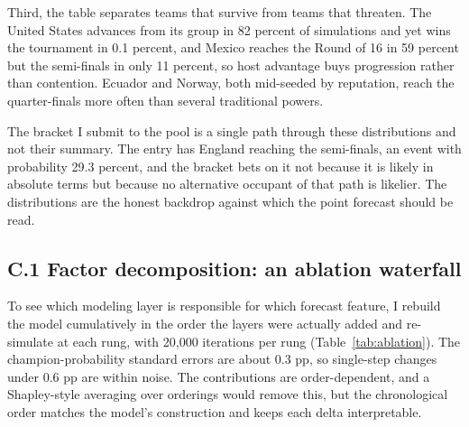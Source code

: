 \documentclass[11pt,letterpaper]{article}
\begin{document}
Third, the table separates teams that survive from teams that threaten. The United States advances from its group in 82 percent of simulations and yet wins the tournament in 0.1 percent, and Mexico reaches the Round of 16 in 59 percent but the semi-finals in only 11 percent, so host advantage buys progression rather than contention. Ecuador and Norway, both mid-seeded by reputation, reach the quarter-finals more often than several traditional powers.

The bracket I submit to the pool is a single path through these distributions and not their summary. The entry has England reaching the semi-finals, an event with probability 29.3 percent, and the bracket bets on it not because it is likely in absolute terms but because no alternative occupant of that path is likelier. The distributions are the honest backdrop against which the point forecast should be read.

\subsection*{C.1 \quad Factor decomposition: an ablation waterfall}

To see which modeling layer is responsible for which forecast feature, I rebuild the model cumulatively in the order the layers were actually added and re-simulate at each rung, with 20{,}000 iterations per rung (Table~\ref{tab:ablation}). The champion-probability standard errors are about 0.3 pp, so single-step changes under 0.6 pp are within noise. The contributions are order-dependent, and a Shapley-style averaging over orderings would remove this, but the chronological order matches the model's construction and keeps each delta interpretable.
\end{document}
